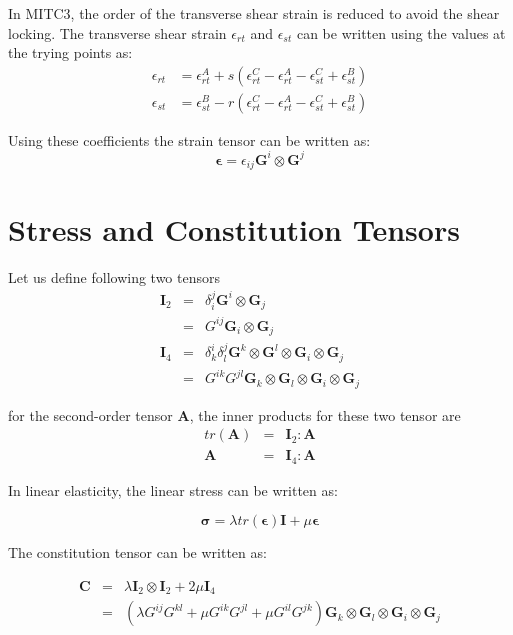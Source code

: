 \documentclass{article}
\begin{document}
In MITC3, the order of the transverse shear strain is reduced to avoid the shear locking.
%
The transverse shear strain $\epsilon_{rt}$ and $\epsilon_{st}$ can be written using the values at the trying points as:
%
\begin{align}
\epsilon_{rt} &= \epsilon_{rt}^A + s(\epsilon_{rt}^C-\epsilon_{rt}^A-\epsilon_{st}^C+\epsilon_{st}^B)\\
\epsilon_{st} &= \epsilon_{st}^B - r(\epsilon_{rt}^C-\epsilon_{rt}^A-\epsilon_{st}^C+\epsilon_{st}^B)
\end{align}

Using these coefficients the strain tensor can be written as:
\begin{equation}
\boldsymbol{\epsilon} = \epsilon_{ij}\mathbf{G}^i\otimes\mathbf{G}^j
\end{equation}


\section{Stress and Constitution Tensors}

Let us define following two tensors
%
\begin{eqnarray}
\mathbf{I}_2
&=& \delta_i^j \mathbf{G}^i\otimes\mathbf{G}_j\\
&=& G^{ij} \mathbf{G}_i\otimes\mathbf{G}_j\\
\mathbf{I}_4 
&=& \delta^i_k\delta^j_l \mathbf{G}^k\otimes\mathbf{G}^l\otimes\mathbf{G}_i\otimes\mathbf{G}_j\\
&=& G^{ik}G^{jl} \mathbf{G}_k\otimes\mathbf{G}_l\otimes\mathbf{G}_i\otimes\mathbf{G}_j
\end{eqnarray}

for the second-order tensor $\mathbf{A}$, the inner products for these two tensor are
\begin{eqnarray}
tr(\mathbf{A}) &=& \mathbf{I}_2:\mathbf{A}\\
\mathbf{A} &=& \mathbf{I}_4:\mathbf{A}
\end{eqnarray}

In linear elasticity, the linear stress can be written as:

\begin{equation}
\boldsymbol{\sigma} = \lambda tr(\boldsymbol{\epsilon}) \mathbf{I} + \mu \boldsymbol{\epsilon}
\end{equation}

The constitution tensor can be written as:

\begin{eqnarray}
\mathbf{C} 
&=& \lambda \mathbf{I}_2\otimes\mathbf{I}_2 + 2\mu \mathbf{I}_4 \\
&=& (\lambda G^{ij}G^{kl} + \mu G^{ik}G^{jl} + \mu G^{il}G^{jk} )\mathbf{G}_k\otimes\mathbf{G}_l\otimes\mathbf{G}_i\otimes\mathbf{G}_j
\end{eqnarray}





\end{document}
